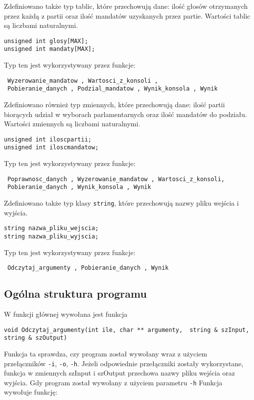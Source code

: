 \documentclass[12pt,a4paper]{article}
\begin{document}
Zdefiniowano także typ tablic, które przechowują dane: ilość głosów otrzymanych przez każdą z partii oraz ilość mandatów uzyskanych przez partie. Wartości tablic są liczbami naturalnymi.
\begin{lstlisting}
unsigned int glosy[MAX];
unsigned int mandaty[MAX];
\end{lstlisting}
Typ ten jest wykorzystywany przez funkcje: \begin{verbatim} Wyzerowanie_mandatow , Wartosci_z_konsoli ,
 Pobieranie_danych , Podzial_mandatow , Wynik_konsola , Wynik \end{verbatim}

Zdefiniowano również typ zmiennych, które przechowują dane: ilość partii biorących udział w wyborach parlamentarnych oraz ilość mandatów do podziału. Wartości zmiennych są liczbami naturalnymi. 
\begin{lstlisting}
unsigned int iloscpartii;
unsigned int iloscmandatow;
\end{lstlisting}

Typ ten jest wykorzystywany przez funkcje: \begin{verbatim} Poprawnosc_danych , Wyzerowanie_mandatow , Wartosci_z_konsoli,
 Pobieranie_danych , Wynik_konsola , Wynik \end{verbatim}

Zdefiniowano także typ klasy \lstinline|string|, które przechowują nazwy pliku wejścia i wyjścia.


\begin{lstlisting}
string nazwa_pliku_wejscia;
string nazwa_pliku_wyjscia;
\end{lstlisting}
Typ ten jest wykorzystywany przez funkcje: \begin{verbatim} Odczytaj_argumenty , Pobieranie_danych , Wynik \end{verbatim}


\subsection{Ogólna struktura programu}

W funkcji głównej wywołana jest funkcja 
\begin{lstlisting}
void Odczytaj_argumenty(int ile, char ** argumenty,  string & szInput, string & szOutput)
\end{lstlisting}
Funkcja ta sprawdza, czy program został wywołany wraz z użyciem przełączników \texttt{-i}, \texttt{-o}, \texttt{-h}. Jeżeli odpowiednie przełączniki zostały wykorzystane, funkcja w zmiennych szInput i szOutput przechowa nazwy pliku wejścia oraz wyjścia. Gdy program został wywołany z użyciem parametru \texttt{-h} Funkcja wywołuje funkcję:
\end{document}
